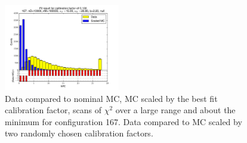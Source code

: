 \begin{figure}[htbp]
\begin{center}
\includegraphics[width=0.45\textwidth]{../FIGURES/167/FIG_Fit_result_for_calibration_factor_of_0_100.pdf} 
\caption{Data compared to nominal MC, MC scaled by the best fit calibration factor, scans of $\chi^2$ over a large range and about the minimum for configuration 167. Data compared to MC scaled by two randomly chosen calibration factors.} 
\label{tab:best_167} 
\end{center} \end{figure} 

